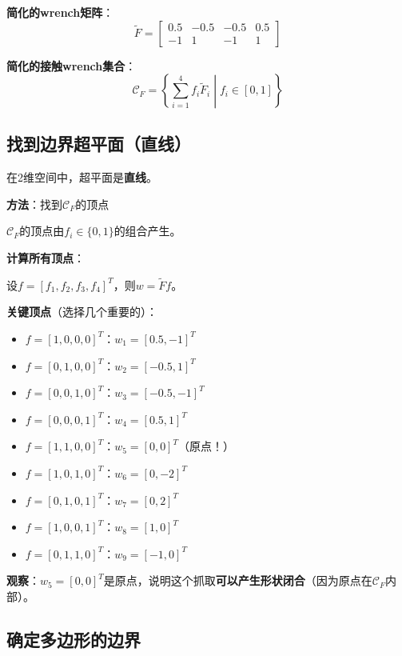 \documentclass[12pt,a4paper]{article}
\begin{document}
\textbf{简化的wrench矩阵}：
\begin{equation}
\tilde{F} = \begin{bmatrix}
0.5 & -0.5 & -0.5 & 0.5 \\
-1 & 1 & -1 & 1
\end{bmatrix}
\end{equation}

\textbf{简化的接触wrench集合}：
\begin{equation}
\mathcal{C}_F = \left\{\sum_{i=1}^4 f_i \tilde{F}_i \middle| f_i \in [0, 1] \right\}
\end{equation}

\subsection{找到边界超平面（直线）}

在2维空间中，超平面是\textbf{直线}。

\textbf{方法}：找到$\mathcal{C}_F$的顶点

$\mathcal{C}_F$的顶点由$f_i \in \{0, 1\}$的组合产生。

\textbf{计算所有顶点}：

设$f = [f_1, f_2, f_3, f_4]^T$，则$w = \tilde{F} f$。

\textbf{关键顶点}（选择几个重要的）：
\begin{itemize}
\item $f = [1, 0, 0, 0]^T$：$w_1 = [0.5, -1]^T$
\item $f = [0, 1, 0, 0]^T$：$w_2 = [-0.5, 1]^T$
\item $f = [0, 0, 1, 0]^T$：$w_3 = [-0.5, -1]^T$
\item $f = [0, 0, 0, 1]^T$：$w_4 = [0.5, 1]^T$
\item $f = [1, 1, 0, 0]^T$：$w_5 = [0, 0]^T$（原点！）
\item $f = [1, 0, 1, 0]^T$：$w_6 = [0, -2]^T$
\item $f = [0, 1, 0, 1]^T$：$w_7 = [0, 2]^T$
\item $f = [1, 0, 0, 1]^T$：$w_8 = [1, 0]^T$
\item $f = [0, 1, 1, 0]^T$：$w_9 = [-1, 0]^T$
\end{itemize}

\textbf{观察}：$w_5 = [0, 0]^T$是原点，说明这个抓取\textbf{可以产生形状闭合}（因为原点在$\mathcal{C}_F$内部）。

\subsection{确定多边形的边界}
\end{document}
